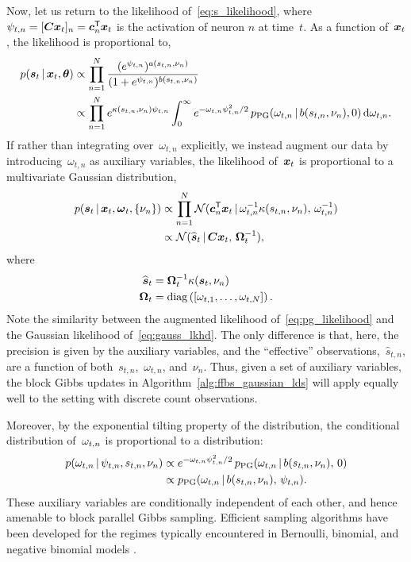 Now, let us return to the likelihood of~\eqref{eq:s_likelihood},
where~${\psi_{t,n} = [\boldsymbol{C} \boldsymbol{x}_t]_n = \boldsymbol{c}_n^{\mathsf{T}} \boldsymbol{x}_t}$ is the activation of neuron $n$
at time~$t$. As a function of~$\boldsymbol{x}_t$, the likelihood is proportional to,
\begin{align*}
  p(\boldsymbol{s}_t \,|\, \boldsymbol{x}_t, \boldsymbol{\theta})
  &\propto \prod_{n=1}^N 
  \frac{(e^{\psi_{t,n}})^{a(s_{t,n}, \nu_n)}}
       {(1+e^{\psi_{t,n}})^{b(s_{t,n}, \nu_n)}} \\
  &\propto \prod_{n=1}^N 
     e^{\kappa(s_{t,n}, \nu_n) \psi_{t,n}}
  \int_{0}^{\infty} e^{-{\omega}_{t,n} \psi_{t,n}^2 /2} \,
  p_{\mathrm{PG}}({\omega}_{t,n} \,|\, b(s_{t,n}, \nu_n), 0) \,
  \mathrm{d}{\omega}_{t,n}.
\end{align*}
If rather than integrating over~$\omega_{t,n}$ explicitly, we instead
augment our data by introducing~$\omega_{t,n}$ as auxiliary variables,
the likelihood of~$\boldsymbol{x}_t$ is proportional to a multivariate Gaussian
distribution,
\begin{align}
  \nonumber
  p(\boldsymbol{s}_t \,|\, \boldsymbol{x}_t, \boldsymbol{\omega}_t, \{\nu_n\})
  &\propto \prod_{n=1}^N
  \mathcal{N}(\boldsymbol{c}_n^{\mathsf{T}} \boldsymbol{x}_t \,|\,
  \omega_{t,n}^{-1} \kappa(s_{t,n}, \nu_n), \,
  \omega_{t,n}^{-1}) \\
  \label{eq:pg_likelihood}
  &\propto \mathcal{N}(
  \widehat{\boldsymbol{s}}_t \,|\,
  \boldsymbol{C} \boldsymbol{x}_t, \, 
  \boldsymbol{\Omega}_t^{-1}),
\end{align}
where
\begin{align*}
  \widehat{\boldsymbol{s}}_t &= \boldsymbol{\Omega}_t^{-1} \kappa(\boldsymbol{s}_t, \nu_n) \\
  \boldsymbol{\Omega}_t &= \mathrm{diag} \left( \left[ \omega_{t,1}, \ldots, \omega_{t,N} \right] \right).
\end{align*}
Note the similarity between the augmented likelihood
of~\eqref{eq:pg_likelihood} and the Gaussian likelihood
of~\eqref{eq:gauss_lkhd}. The only difference is that, here, the
precision is given by the auxiliary variables, and the ``effective''
observations,~$\widehat{s}_{t,n}$, are a function of
both~$s_{t,n}$,~$\omega_{t,n}$, and~$\nu_n$.  Thus, given a set of
\polyagamma auxiliary variables, the block Gibbs updates in
Algorithm~\ref{alg:ffbs_gaussian_lds} will apply equally well to the
setting with discrete count observations.

Moreover, by the exponential tilting property of the \polyagamma
distribution, the conditional distribution of~${\omega}_{t,n}$
is proportional to a \polyagamma distribution:
\begin{align}
  \nonumber
  p({\omega}_{t,n} \,|\, \psi_{t,n}, s_{t,n}, \nu_n) &
  \propto e^{-{\omega}_{t,n} \psi_{t,n}^2/2} \,
  p_{\mathrm{PG}}({\omega}_{t,n} \,|\, b(s_{t,n}, \nu_n), \, 0) \\
  \label{eq:omega_conditional}
  &\propto p_{\mathrm{PG}}({\omega}_{t,n} \,|\, b(s_{t,n}, \nu_n), \, \psi_{t,n}).
\end{align}
These auxiliary variables are conditionally independent of each other,
and hence amenable to block parallel Gibbs sampling.  Efficient
\polyagamma sampling algorithms have been developed for the regimes
typically encountered in Bernoulli, binomial, and negative binomial
models \citep{windle2014sampling}.

